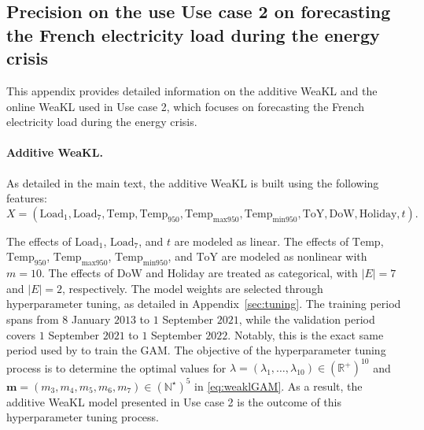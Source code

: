 \subsection{Precision on the use Use case 2 on forecasting the French electricity load during the energy crisis}
\label{sec:sobriety}
This appendix provides detailed information on the additive WeaKL and the online WeaKL used in Use case 2, which focuses on forecasting the French electricity load during the energy crisis.
\paragraph{Additive WeaKL.} As detailed in the main text, the additive WeaKL is built using the following features:
\[X =(\mathrm{Load}_1, \mathrm{Load}_7, \mathrm{Temp}, \mathrm{Temp}_{950},  \mathrm{Temp}_{\mathrm{max 950}}, \mathrm{Temp}_{\mathrm{min 950}}, \mathrm{ToY},  \mathrm{DoW}, \mathrm{Holiday},t).
\]

The effects of $\mathrm{Load}_1$, $\mathrm{Load}_7$, and $t$ are modeled as linear. The effects of $\mathrm{Temp}$, $\mathrm{Temp}_{950}$,  $\mathrm{Temp}_{\mathrm{max 950}}$, $ \mathrm{Temp}_{\mathrm{min 950}}$, and $\mathrm{ToY}$ are modeled as nonlinear with $m=10$. The effects of $\mathrm{DoW}$ and $\mathrm{Holiday}$ are treated as categorical, with $|E| = 7$ and $|E| = 2$, respectively. The model weights are selected through hyperparameter tuning, as detailed in Appendix~\ref{sec:tuning}. The training period spans from $8$ January $2013$ to $1$ September $2021$, while the validation period covers $1$ September $2021$ to $1$ September $2022$. Notably, this is the exact same period used by \citet{doumeche2023human} to train the GAM. The objective of the hyperparameter tuning process is to determine the optimal values for $\lambda = (\lambda_1, \hdots, \lambda_{10}) \in (\mathbb R^+)^{10}$ and $\mathbf{m} = (m_3, m_4, m_5, m_6, m_7) \in (\mathbb N^\star)^5$ in \eqref{eq:weaklGAM}. As a result, the additive WeaKL model presented in Use case 2 is the outcome of this hyperparameter tuning process.

